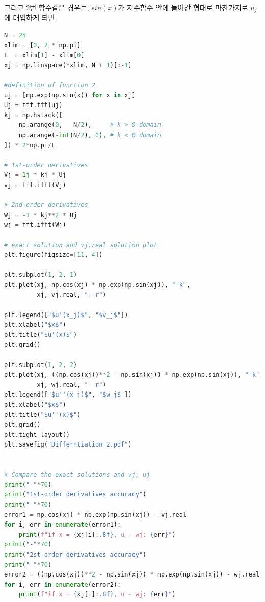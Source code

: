 \documentclass[11pt]{article}
\begin{document}
\pagebreak 
그리고 2번 함수같은 경우는, $sin(x)$가 지수함수 안에 들어간 형태로 마찬가지로 $u_j$에 대입하게 되면,
\begin{lstlisting}[language=Python]
N = 25
xlim = [0, 2 * np.pi]
L  = xlim[1] - xlim[0]
xj = np.linspace(*xlim, N + 1)[:-1]

#definition of function 2
uj = [np.exp(np.sin(x)) for x in xj]
Uj = fft.fft(uj)
kj = np.hstack([
    np.arange(0,   N/2),     # k > 0 domain
    np.arange(-int(N/2), 0), # k < 0 domain
]) * 2*np.pi/L

# 1st-order derivatives
Vj = 1j * kj * Uj
vj = fft.ifft(Vj)

# 2nd-order derivatives
Wj = -1 * kj**2 * Uj
wj = fft.ifft(Wj)

# exact solution and vj.real solution plot
plt.figure(figsize=[11, 4])

plt.subplot(1, 2, 1)
plt.plot(xj, np.cos(xj) * np.exp(np.sin(xj)), "-k",
         xj, vj.real, "--r")

plt.legend(["$u'(x_j)$", "$v_j$"])
plt.xlabel("$x$")
plt.title("$u'(x)$")
plt.grid()

plt.subplot(1, 2, 2)
plt.plot(xj, ((np.cos(xj))**2 - np.sin(xj)) * np.exp(np.sin(xj)), "-k",
         xj, wj.real, "--r")
plt.legend(["$u''(x_j)$", "$w_j$"])
plt.xlabel("$x$")
plt.title("$u''(x)$")
plt.grid()
plt.tight_layout()
plt.savefig("Differntiation_2.pdf")


# Compare the exact solutions and vj, uj
print("-"*70)
print("1st-order derivatives accuracy")
print("-"*70)
error1 = np.cos(xj) * np.exp(np.sin(xj)) - vj.real 
for i, err in enumerate(error1):
    print(f"if x = {xj[i]:.8f}, u - wj: {err}")
print("-"*70)
print("2st-order derivatives accuracy")
print("-"*70)
error2 = ((np.cos(xj))**2 - np.sin(xj)) * np.exp(np.sin(xj)) - wj.real 
for i, err in enumerate(error2):
    print(f"if x = {xj[i]:.8f}, u - wj: {err}")
    

\end{lstlisting}
\end{document}
